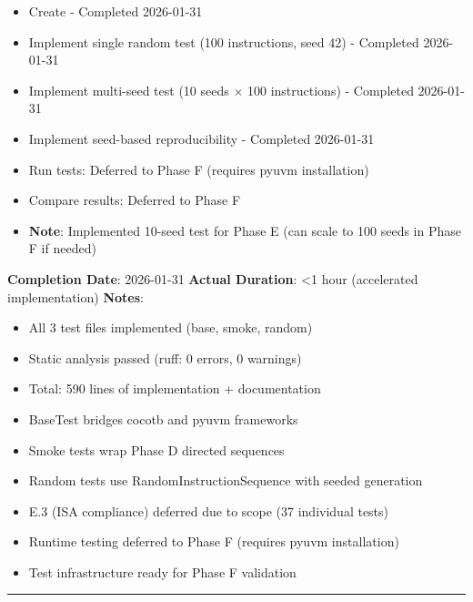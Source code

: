 \begin{record}

\begin{itemize}
\tightlist
\item[$\boxtimes$]
  Create  - Completed 2026-01-31
\item[$\boxtimes$]
  Implement single random test (100 instructions, seed 42) - Completed
  2026-01-31
\item[$\boxtimes$]
  Implement multi-seed test (10 seeds × 100 instructions) - Completed
  2026-01-31
\item[$\boxtimes$]
  Implement seed-based reproducibility - Completed 2026-01-31
\item[$\boxtimes$]
  Run tests: Deferred to Phase F (requires pyuvm installation)
\item[$\boxtimes$]
  Compare results: Deferred to Phase F
\end{itemize}

\begin{itemize}
\tightlist
\item
  \textbf{Note}: Implemented 10-seed test for Phase E (can scale to 100
  seeds in Phase F if needed)
\end{itemize}

\textbf{Completion Date}: 2026-01-31 \textbf{Actual Duration}:
\textless1 hour (accelerated implementation) \textbf{Notes}:

\begin{itemize}
\tightlist
\item
  All 3 test files implemented (base, smoke, random)
\item
  Static analysis passed (ruff: 0 errors, 0 warnings)
\item
  Total: 590 lines of implementation + documentation
\item
  BaseTest bridges cocotb and pyuvm frameworks
\item
  Smoke tests wrap Phase D directed sequences
\item
  Random tests use RandomInstructionSequence with seeded generation
\item
  E.3 (ISA compliance) deferred due to scope (37 individual tests)
\item
  Runtime testing deferred to Phase F (requires pyuvm installation)
\item
  Test infrastructure ready for Phase F validation
\end{itemize}

\begin{center}\rule{0.5\linewidth}{0.5pt}\end{center}

\end{record}

